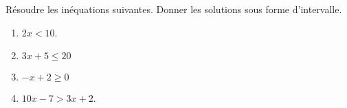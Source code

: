 
\begin{exercice}\label{exosmath-0498}

    Résoudre les inéquations suivantes. Donner les solutions sous forme d'intervalle.
    \begin{multicols}{2}
        \begin{enumerate}
            \item
                \( 2x<10\).
            \item
                \( 3x+5\leq 20\)
            \item
                \( -x+2\geq 0\)
            \item
                \( 10x-7>3x+2\).
        \end{enumerate}
    \end{multicols}

\end{exercice}
